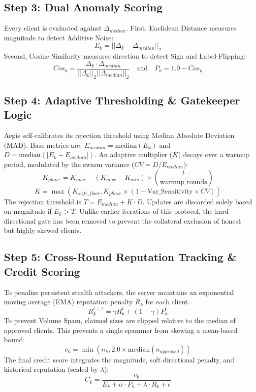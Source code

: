 \documentclass[10pt, conference]{IEEEtran}
\begin{document}
\subsection{Step 3: Dual Anomaly Scoring}
Every client is evaluated against $\Delta_{median}$. 
First, Euclidean Distance measures magnitude to detect Additive Noise:
\begin{equation}
E_k = ||\Delta_k - \Delta_{median}||_2
\end{equation}
Second, Cosine Similarity measures direction to detect Sign and Label-Flipping:
\begin{equation}
Cos_k = \frac{\Delta_k \cdot \Delta_{median}}{||\Delta_k||_2 ||\Delta_{median}||_2} \quad \text{and} \quad P_k = 1.0 - Cos_k
\end{equation}

\subsection{Step 4: Adaptive Thresholding \& Gatekeeper Logic}
Aegis self-calibrates its rejection threshold using Median Absolute Deviation (MAD). Base metrics are: $E_{median} = \text{median}(E_k)$ and $D = \text{median}(|E_k - E_{median}|)$.
An adaptive multiplier ($K$) decays over a warmup period, modulated by the swarm variance ($CV = D / E_{median}$):
\begin{equation}
K_{phase} = K_{max} - (K_{max} - K_{min}) \times \left(\frac{t}{\text{warmup\_rounds}}\right)
\end{equation}
\begin{equation}
K = \max\left(K_{safe\_floor}, K_{phase} \times (1 + \text{Var\_Sensitivity} \times CV)\right)
\end{equation}
The rejection threshold is $T = E_{median} + K \cdot D$. Updates are discarded solely based on magnitude if $E_k > T$. Unlike earlier iterations of this protocol, the hard directional gate has been removed to prevent the collateral exclusion of honest but highly skewed clients.

\subsection{Step 5: Cross-Round Reputation Tracking \& Credit Scoring}
To penalize persistent stealth attackers, the server maintains an exponential moving average (EMA) reputation penalty $R_k$ for each client.
\begin{equation}
R_k^{t+1} = \gamma R_k^t + (1 - \gamma) P_k^t
\end{equation}
To prevent Volume Spam, claimed sizes are clipped relative to the median of approved clients. This prevents a single spammer from skewing a mean-based bound:
\begin{equation}
v_k = \min(n_k, 2.0 \times \text{median}(n_{approved}))
\end{equation}
The final credit score integrates the magnitude, soft directional penalty, and historical reputation (scaled by $\lambda$):
\begin{equation}
C_k = \frac{v_k}{E_k + \alpha \cdot P_k + \lambda \cdot R_k + \epsilon}
\end{equation}
\end{document}

